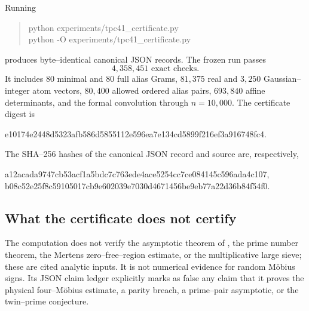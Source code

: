 Running
\begin{quote}
\ttfamily
python experiments/tpc41\_certificate.py\\
python -O experiments/tpc41\_certificate.py
\end{quote}
produces byte--identical canonical JSON records.  The frozen run passes
\begin{equation}
 \boxed{4{,}358{,}451\text{ exact checks}.}
 \label{eq:tpc41-certificate-checks}
\end{equation}
It includes \(80\) minimal and \(80\) full alias Grams,
\(81{,}375\) real and \(3{,}250\) Gaussian--integer atom vectors,
\(80{,}400\) allowed ordered alias pairs, \(693{,}840\) affine
determinants, and the formal convolution through \(n=10{,}000\).
The certificate digest is
\begin{center}
\ttfamily\small
e10174e2448d5323afb586d5855112e596ea7e134cd5899f216ef3a916748fc4.
\end{center}
The SHA--256 hashes of the canonical JSON record and source are,
respectively,
\begin{center}
\ttfamily\small
a12acada9747cb53acf1a5bdc7c763ede4ace5254cc7ce084145c596ada4c107,\\
b08c52e25f8c59105017cb9e602039e7030d4671456be9eb77a22d36b84f54f0.
\end{center}

\subsection{What the certificate does not certify}

The computation does not verify the asymptotic theorem of
\citet{KlurmanMangerelTeravainen2023}, the prime number theorem, the
Mertens zero--free--region estimate, or the multiplicative large sieve;
these are cited analytic inputs.  It is not numerical evidence for random
M\"obius signs.  Its JSON claim ledger explicitly marks as false any claim
that it proves the physical four--M\"obius estimate, a parity breach, a
prime--pair asymptotic, or the twin--prime conjecture.
